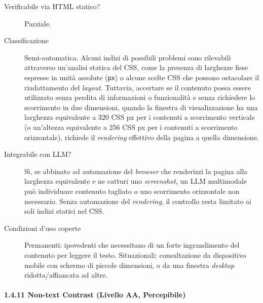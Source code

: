 \begin{description}

\item[Verificabile via HTML statico?] Parziale.
\item[Classificazione] Semi-automatica. Alcuni indizi di possibili problemi sono rilevabili attraverso un'analisi statica del CSS, come la presenza di larghezze fisse espresse in unità assolute (\texttt{px}) o alcune scelte CSS che possono ostacolare il riadattamento del \emph{layout}. Tuttavia, accertare se il contenuto possa essere utilizzato senza perdita di informazioni o funzionalità e senza richiedere lo scorrimento in due dimensioni, quando la finestra di visualizzazione ha una larghezza equivalente a 320 CSS px per i contenuti a scorrimento verticale (o un'altezza equivalente a 256 CSS px per i contenuti a scorrimento orizzontale), richiede il \emph{rendering} effettivo della pagina a quella dimensione.
\item[Integrabile con LLM?] Sì, se abbinato ad automazione del \emph{browser} che renderizzi la pagina alla larghezza equivalente e ne catturi uno \emph{screenshot}, un LLM multimodale può individuare contenuto tagliato o uno scorrimento orizzontale non necessario. Senza automazione del \emph{rendering}, il controllo resta limitato ai soli indizi statici nel CSS.

\item[Condizioni d'uso coperte] Permanenti: ipovedenti che necessitano di un forte ingrandimento del contenuto per leggere il testo. Situazionali: consultazione da dispositivo mobile con schermo di piccole dimensioni, o da una finestra \emph{desktop} ridotta/affiancata ad altre.

\end{description}

\paragraph*{1.4.11 Non-text Contrast (Livello AA, Percepibile)}

